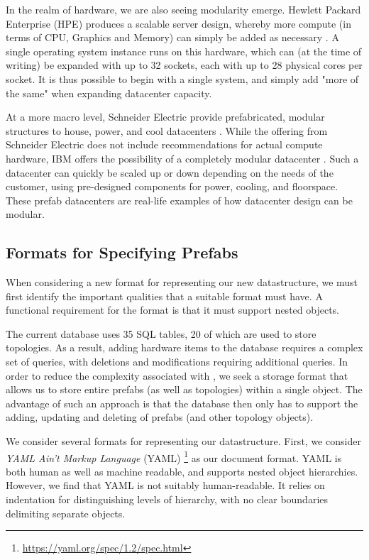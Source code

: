 \documentclass[11pt]{article}
\begin{document}
		In the realm of hardware, we are also seeing modularity emerge. 
		Hewlett Packard Enterprise (HPE) produces a scalable server design, whereby more compute (in terms of CPU, Graphics and Memory) can simply be added as necessary \cite{Bang2020}.
		A single operating system instance runs on this hardware, which can (at the time of writing) be expanded with up to 32 sockets, each with up to 28 physical cores per socket.
		It is thus possible to begin with a single system, and simply add "more of the same" when expanding datacenter capacity.

		At a more macro level, Schneider Electric provide prefabricated, modular structures to house, power, and cool datacenters \cite{Torell2014, Torell2017}.
		While the offering from Schneider Electric does not include recommendations for actual compute hardware, IBM offers the possibility of a completely modular datacenter \cite{IBM2014}.
		Such a datacenter can quickly be scaled up or down depending on the needs of the customer, using pre-designed components for power, cooling, and floorspace. 
		These prefab datacenters are real-life examples of how datacenter design can be modular.

	
	\subsection{Formats for Specifying Prefabs}
		When considering a new format for representing our new datastructure, we must first identify the important qualities that a suitable format must have. 
		A functional requirement for the format is that it must support nested objects. 

		The current \opendc{} database uses 35 SQL tables, 20 of which are used to store topologies.
		As a result, adding hardware items to the database requires a complex set of queries, with deletions and modifications requiring additional queries.
		In order to reduce the complexity associated with \opendc{}, we seek a storage format that allows us to store entire prefabs (as well as topologies) within a single object.
		The advantage of such an approach is that the database then only has to support the adding, updating and deleting of prefabs (and other topology objects).

		We consider several formats for representing our datastructure.
		First, we consider \textit{YAML Ain't Markup Language} (YAML) \footnote{\url{https://yaml.org/spec/1.2/spec.html}} as our document format.
		YAML is both human as well as machine readable, and supports nested object hierarchies.
		However, we find that YAML is not suitably human-readable.
		It relies on indentation for distinguishing levels of hierarchy, with no clear boundaries delimiting separate objects.
\end{document}
